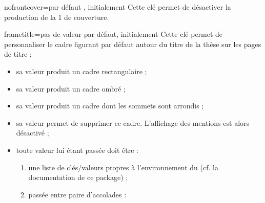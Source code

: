 \begin{docKey}{nofrontcover}{=\textbar{}}{par défaut
    , initialement }%
  Cette clé permet de désactiver la production de la 1\iere{} de couverture.
\end{docKey}

{%
\begin{docKey}{frametitle}{=\textbar{}\textbar{}\textbar{}\textbar{}}{pas de valeur par défaut, initialement }
  Cette clé permet de personnaliser le cadre figurant par défaut autour du
  titre de la thèse sur les pages de titre :
  \begin{itemize}
  \item sa valeur  produit un cadre rectangulaire ;
  \item sa valeur  produit un cadre ombré ;
  \item sa valeur  produit un cadre dont les sommets sont
    arrondis ;
  \item sa valeur  permet de supprimer ce cadre. L'affichage des
    mentions  est alors désactivé ;
  \item toute  valeur lui étant passée doit être :
    \begin{enumerate}
    \item une liste de clés/valeurs propres à l'environnement
       du  (cf. la
      documentation de ce package) ;
    \item passée entre paire d'accolades :
\begin{preamblecode}[]
\end{preamblecode}
    \end{enumerate}
  \end{itemize}
\end{docKey}
}

